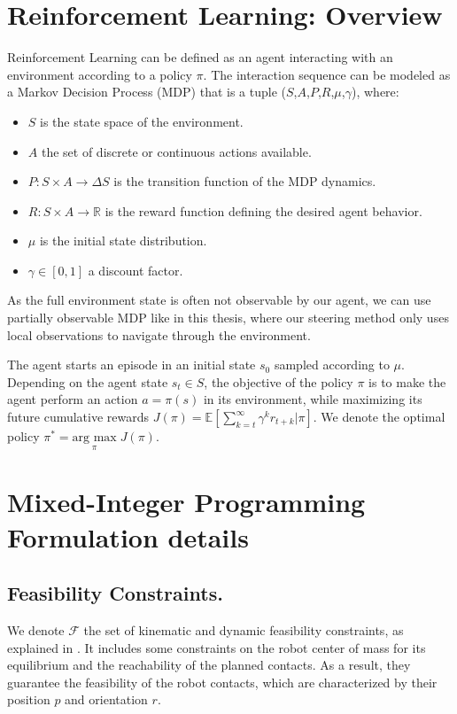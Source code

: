 \appendix

\chapter{Reinforcement Learning: Overview}
\label{appendix:rl_overview}

Reinforcement Learning can be defined as an agent interacting with an environment according to a policy $\pi$. 
The interaction sequence can be modeled as a Markov Decision Process (MDP) that is a tuple ($S$,$A$,$P$,$R$,$\mu$,$\gamma$), where:
\begin{itemize}
    \item $S$ is the state space of the environment.
    \item $A$ the set of discrete or continuous actions available.
    \item $P: S \times A \rightarrow \Delta S$ is the transition function of the MDP dynamics.
    \item $R: S \times A \rightarrow \mathbb{R}$ is the reward function defining the desired agent behavior.
    \item $\mu$ is the initial state distribution.
    \item $\gamma \in [0,1]$ a discount factor.
\end{itemize}
As the full environment state is often not observable by our agent, we can use partially observable MDP like in this thesis, where our steering method only uses local observations to navigate through the environment.

The agent starts an episode in an initial state $s_0$ sampled according to $\mu$.
Depending on the agent state $s_t \in S$, the objective of the policy $\pi$ is to make the agent perform an action $a=\pi(s)$ in its environment, while maximizing its future cumulative rewards $J(\pi) = \mathbb{E}[\sum_{k=t}^{\infty} \gamma^k r_{t+k} | \pi]$.
We denote the optimal policy $\pi^* = \underset{\pi}{\mbox{arg max}} \; J(\pi)$.





\chapter{Mixed-Integer Programming Formulation details}

\section{Feasibility Constraints.\label{appendix:feasibility_constr}}
We denote $\mathcal{F}$ the set of kinematic and dynamic feasibility constraints, as explained in \cite{sl1m_v1}. 
It includes some constraints on the robot center of mass for its equilibrium and the reachability of the planned contacts.
As a result, they guarantee the feasibility of the robot contacts, which are characterized by their position $p$ and orientation $r$.

